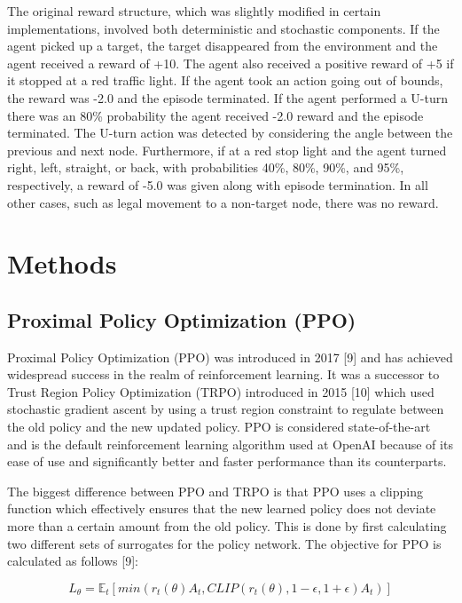 \documentclass{article}
\begin{document}
	The original reward structure, which was slightly modified in certain implementations, involved both deterministic and stochastic components. If the agent picked up a target, the target disappeared from the environment and the agent received a reward of +10. The agent also received a positive reward of +5 if it stopped at a red traffic light. If the agent took an action going out of bounds, the reward was -2.0 and the episode terminated. If the agent performed a U-turn there was an 80\% probability the agent received -2.0 reward and the episode terminated. The U-turn action was detected by considering the angle between the previous and next node. Furthermore, if at a red stop light and the agent turned right, left, straight, or back, with probabilities 40\%, 80\%, 90\%, and 95\%, respectively, a reward of -5.0 was given along with episode termination. In all other cases, such as legal movement to a non-target node, there was no reward.
	
	\section{Methods}
	\subsection{Proximal Policy Optimization (PPO)}
	\label{ppo}
	
	Proximal Policy Optimization (PPO) was introduced in 2017 [9] and has achieved widespread success in the realm of reinforcement learning. It was a successor to Trust Region Policy Optimization (TRPO) introduced in 2015 [10] which used stochastic gradient ascent by using a trust region constraint to regulate between the old policy and the new updated policy. PPO is considered state-of-the-art and is the default reinforcement learning algorithm used at OpenAI because of its ease of use and significantly better and faster performance than its counterparts. 
	
	The biggest difference between PPO and TRPO is that PPO uses a clipping function which effectively ensures that the new learned policy does not deviate more than a certain amount from the old policy. This is done by first calculating two different sets of surrogates for the policy network. The objective for PPO is calculated as follows [9]:
	
	\begin{equation}
		L_{\theta} = \mathbb{E}_{t}[min(r_{t}({\theta})A_{t}, CLIP(r_{t}({\theta}), 1-\epsilon, 1+\epsilon)A_{t})]
	\end{equation}
	
\end{document}
